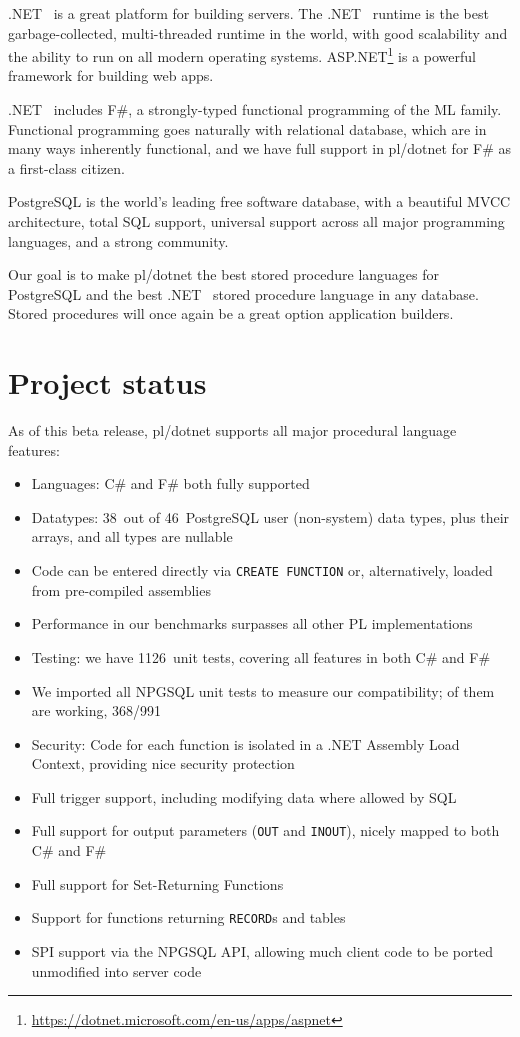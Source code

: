 \documentclass[sigconf,techreport,authorversion,nonacm]{acmart}
\newcommand{\dotnet}{.NET }
\newcommand{\psqltypecount}{46}
\newcommand{\pldotnettypecount}{38}
\newcommand{\unittestcount}{1126}
\newcommand{\npgsqlcount}{991}
\newcommand{\npgsqlpassing}{368}
\begin{document}
\dotnet\ is a great platform for building servers. The \dotnet\ runtime
is the best garbage-collected, multi-threaded runtime in the world, with
good scalability and the ability to run on all modern operating systems.
ASP.NET\footnote{\url{https://dotnet.microsoft.com/en-us/apps/aspnet}}
is a powerful framework for building web apps.

\dotnet\ includes F\#, a strongly-typed functional programming of the ML
family.  Functional programming goes naturally with relational database,
which are in many ways inherently functional, and we have full support
in pl/dotnet for F\# as a first-class citizen.

PostgreSQL is the world's leading free software database, with a
beautiful MVCC architecture, total SQL support, universal support
across all major programming languages, and a strong community.

Our goal is to make pl/dotnet the best stored procedure
languages for PostgreSQL and the best \dotnet\ stored procedure
language in any database.  Stored procedures will once again
be a great option application builders.

\section{Project status}

As of this beta release, pl/dotnet supports all major procedural language features:

\begin{itemize}[itemsep=0pt]
    \item Languages: C\# and F\# both fully supported
    \item Datatypes: \pldotnettypecount\ out of \psqltypecount\ PostgreSQL user (non-system) data types, plus their arrays, and all types are nullable
    \item Code can be entered directly via \texttt{CREATE FUNCTION} or, alternatively, loaded from pre-compiled assemblies
    \item Performance in our benchmarks surpasses all other PL implementations
    \item Testing: we have \unittestcount\, unit tests, covering all features in both C\# and F\#
    \item We imported all NPGSQL unit tests to measure our compatibility; \npgsqlpercentage of them are working,  \npgsqlpassing/\npgsqlcount
    \item Security: Code for each function is isolated in a \dotnet Assembly Load Context, providing nice security protection
    \item Full trigger support, including modifying data where allowed by SQL
    \item Full support for output parameters (\texttt{OUT} and \texttt{INOUT}), nicely mapped to both C\# and F\#
    \item Full support for Set-Returning Functions
    \item Support for functions returning \texttt{RECORD}s and tables
    \item SPI support via the NPGSQL API, allowing much client code to be ported unmodified into server code
\end{itemize}
\end{document}
